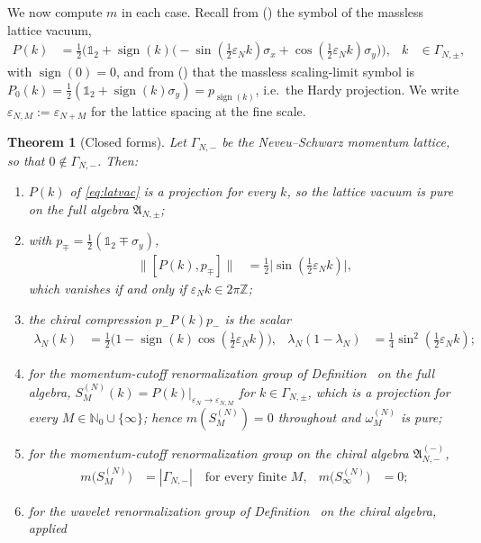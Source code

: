 \documentclass[11pt,a4paper]{article}
\newtheorem{thm}{Theorem}[section]
\theoremstyle{definition}
\newcommand{\fA}{\mathfrak{A}}
\newcommand{\vep}{\varepsilon}
\newcommand{\1}{\mathds{1}}
\newcommand{\sign}{\operatorname{sign}}
\newcommand{\Z}{\mathbb{Z}}
\newcommand{\N}{\mathbb{N}}
\newcommand{\Gam}{\Gamma}
\begin{document}
We now compute $m$ in each case. Recall from (\mrLatVac) the symbol of the massless lattice vacuum,
\begin{align}
\label{eq:latvac}
P(k) & = \tfrac{1}{2}\big(\1_{2}+\sign(k)\big(-\sin(\tfrac{1}{2}\vep_{N}k)\sigma_{x}
 +\cos(\tfrac{1}{2}\vep_{N}k)\sigma_{y}\big)\big), & k & \in\Gam_{N,\pm},
\end{align}
with $\sign(0)=0$, and from (\mrHardy) that the massless scaling-limit symbol is
$P_{0}(k)=\tfrac{1}{2}(\1_{2}+\sign(k)\sigma_{y})=p_{\sign(k)}$, i.e.~the Hardy projection. We write
$\vep_{N,M}:=\vep_{N+M}$ for the lattice spacing at the fine scale.

\begin{thm}[Closed forms]
\label{thm:model}
Let $\Gam_{N,-}$ be the Neveu--Schwarz momentum lattice, so that $0\notin\Gam_{N,-}$. Then:
\begin{enumerate}
\item[(i)] $P(k)$ of \eqref{eq:latvac} is a projection for every $k$, so the lattice vacuum is pure
on the \emph{full} algebra $\fA_{N,\pm}$;
\item[(ii)] with $p_{\mp}=\tfrac{1}{2}(\1_{2}\mp\sigma_{y})$,
\begin{align}
\label{eq:commutator}
\big\|[P(k),p_{\mp}]\big\| & = \tfrac{1}{2}\big|\sin(\tfrac{1}{2}\vep_{N}k)\big|,
\end{align}
which vanishes if and only if $\vep_{N}k\in2\pi\Z$;
\item[(iii)] the chiral compression $p_{-}P(k)p_{-}$ is the scalar
\begin{align}
\label{eq:chiraleig}
\lambda_{N}(k) & = \tfrac{1}{2}\big(1-\sign(k)\cos(\tfrac{1}{2}\vep_{N}k)\big), &
\lambda_{N}(1-\lambda_{N}) & = \tfrac{1}{4}\sin^{2}(\tfrac{1}{2}\vep_{N}k);
\end{align}
\item[(iv)] for the momentum-cutoff renormalization group of Definition \mrDefMomRG\ on the full algebra,
$S^{(N)}_{M}(k)=P(k)|_{\vep_{N}\rightarrow\vep_{N,M}}$ for $k\in\Gam_{N,\pm}$, which is a projection
for every $M\in\N_{0}\cup\{\infty\}$; hence $m(S^{(N)}_{M})=0$ throughout and
$\omega^{(N)}_{M}$ is pure;
\item[(v)] for the momentum-cutoff renormalization group on the \emph{chiral} algebra
$\fA^{(-)}_{N,-}$,
\begin{align}
\label{eq:mchiral}
m\big(S^{(N)}_{M}\big) & = |\Gam_{N,-}| \quad\text{for every finite }M, &
m\big(S^{(N)}_{\infty}\big) & = 0;
\end{align}
\item[(vi)] for the wavelet renormalization group of Definition \mrDefWavRG\ on the chiral algebra, applied

\end{enumerate}
\end{thm}
\end{document}

